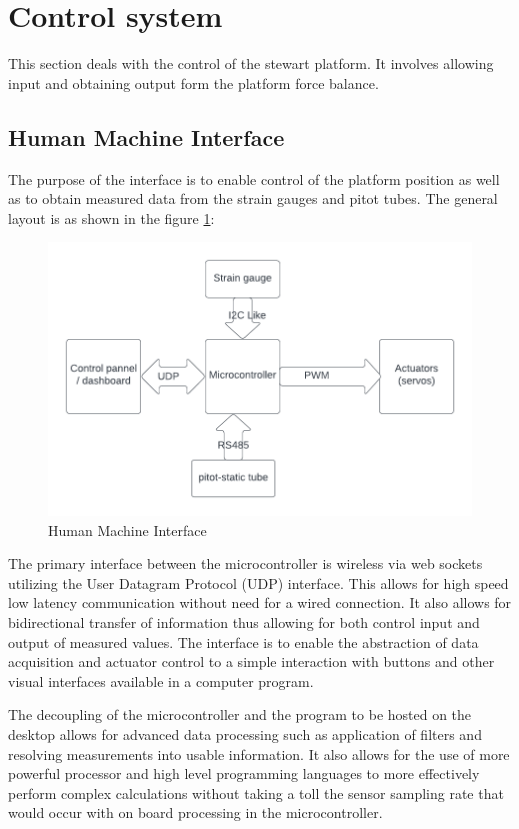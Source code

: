 \section{Control system}
This section deals with the control of the stewart platform. It involves allowing input and obtaining output form the platform force balance.
\subsection{Human Machine Interface}
The purpose of the interface is to enable control of the platform position as well as to obtain measured data from the strain gauges and pitot tubes. 
The general layout is as shown in the figure \ref{fig:hmi}:
\begin{center}
\begin{figure}[H]
\centering
\includegraphics{Figures/Interface}
\caption[Human Machine Interface]{Human Machine Interface}
\label{fig:hmi}
\end{figure}
\end{center}

The primary interface between the microcontroller is wireless via web sockets utilizing the User Datagram Protocol (UDP) interface. This allows for high speed low latency communication without need for a wired connection. It also allows for bidirectional transfer of information thus allowing for both control input and output of measured values. The interface is to enable the abstraction of data acquisition and actuator control to a simple interaction with buttons and other visual interfaces available in a computer program.

The decoupling of the microcontroller and the program to be hosted on the desktop allows for advanced data processing such as application of filters and resolving measurements into usable information. It also allows for the use of more powerful processor and high level programming languages to more effectively perform complex calculations without taking a toll the sensor sampling rate that would occur with on board processing in the microcontroller.

